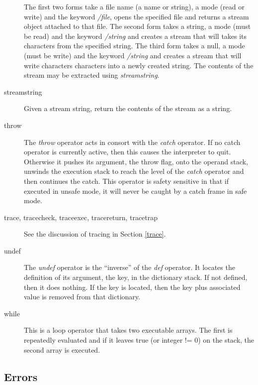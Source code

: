 \begin{description}
\begin{enumerate}
\end{enumerate}
The first two forms take a file name (a name or string),
a mode (read or write) and the
keyword {\em /file}, opens the specified file and returns a stream
object attached to that file.
The second form takes a string, a mode (must be read) and the
keyword {\em /string} and creates a stream that will takes its
characters from the specified string.
The third form takes a null, a mode (must be write) and the
keyword {\em /string} and creates a stream that will write characters
characters into a newly created string.
The contents of the stream may be extracted using {\em streamstring}.
\item[streamstring]
Given a stream string, return the contents of the stream as a string.
\item[throw]
The {\em throw} operator acts in consort with the {\em catch} operator.
If no catch operator is currently active, then this causes the interpreter to
quit.  Otherwise it pushes its argument, the throw flag, onto the
operand stack, unwinds the execution stack to reach the level
of the {\em catch} operator and then continues the catch.
This operator is safety sensitive in that if executed in
unsafe mode, it will never be caught by a catch frame
in safe mode.
\item[trace, tracecheck, traceexec, tracereturn, tracetrap]
See the discussion of tracing in Section \ref{trace}.
\item[undef]
The {\em undef} operator is the ``inverse'' of the {\em def} operator.
It locates the definition of its argument, the key, in the dictionary
stack.  If not defined, then it does nothing.
If the key is located, then the key plus associated
value is removed from that dictionary.
\item[while]
This is a loop operator that takes two executable arrays.
The first is repeatedly evaluated and if it leaves true (or integer != 0)
on the stack, the second array is executed.
\end{description}

\subsection{Errors}
\label{error}

